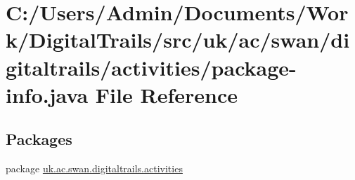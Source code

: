 \hypertarget{activities_2package-info_8java}{\section{C\+:/\+Users/\+Admin/\+Documents/\+Work/\+Digital\+Trails/src/uk/ac/swan/digitaltrails/activities/package-\/info.java File Reference}
\label{activities_2package-info_8java}
}
\subsection*{Packages}
\begin{DoxyCompactItemize}
\item 
package \hyperlink{namespaceuk_1_1ac_1_1swan_1_1digitaltrails_1_1activities}{uk.\+ac.\+swan.\+digitaltrails.\+activities}
\end{DoxyCompactItemize}

